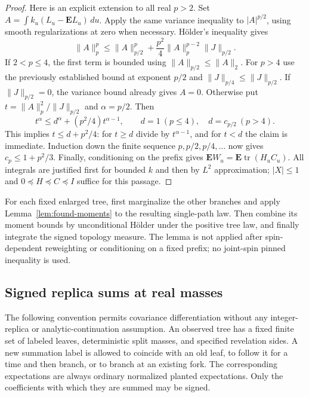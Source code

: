 \begin{proof}
Here is an explicit extension to all real $p>2$. Set
$A=\int k_u(L_u-\mathbf EL_u)\,du$. Apply the same variance inequality
to $|A|^{p/2}$, using smooth regularizations at zero when necessary.
H\"older's inequality gives
\[
 \|A\|_p^p\leq\|A\|_{p/2}^p
       +\frac{p^2}{4}\|A\|_p^{p-2}\|J\|_{p/2}.
\]
If $2<p\leq4$, the first term is bounded using
$\|A\|_{p/2}\leq\|A\|_2$. For $p>4$ use the previously established
bound at exponent $p/2$ and
$\|J\|_{p/4}\leq\|J\|_{p/2}$. If $\|J\|_{p/2}=0$, the variance bound
already gives $A=0$. Otherwise put
$t=\|A\|_p^2/\|J\|_{p/2}$ and $\alpha=p/2$. Then
\[
 t^\alpha\leq d^\alpha+(p^2/4)t^{\alpha-1},
 \qquad d=1\ (p\leq4),\quad d=c_{p/2}\ (p>4).
\]
This implies $t\leq d+p^2/4$: for $t\geq d$ divide by
$t^{\alpha-1}$, and for $t<d$ the claim is immediate. Induction down the
finite sequence $p,p/2,p/4,\ldots$ now gives $c_p\leq1+p^2/3$.
Finally, conditioning on the prefix gives
$\mathbf EW_u=\mathbf E\operatorname{tr}(H_uC_u)$.
All integrals are justified first for bounded $k$ and then by $L^2$
approximation; $|X|\leq1$ and $0\preceq H\preceq C\preceq I$ suffice
for this passage.
\end{proof}

\begin{remark}\label{rem:found-single-pin}
For each fixed enlarged tree, first marginalize the other branches and
apply Lemma~\ref{lem:found-moments} to the resulting single-path law.
Then combine its moment bounds by unconditional H\"older under the
positive tree law, and finally integrate the signed topology measure.
The lemma is not applied after spin-dependent reweighting or conditioning
on a fixed prefix; no joint-spin pinned inequality is used.
\end{remark}

\subsection{Signed replica sums at real masses}

The following convention permits covariance differentiation without any
integer-replica or analytic-continuation assumption. An observed tree has
a fixed finite set of labeled leaves, deterministic split masses, and
specified revelation sides. A new summation label is allowed to coincide
with an old leaf, to follow it for a time and then branch, or to branch
at an existing fork. The corresponding expectations are always ordinary
normalized planted expectations. Only the coefficients with which they
are summed may be signed.

